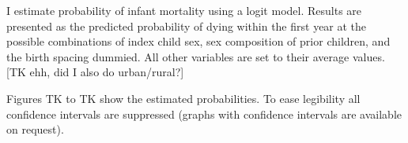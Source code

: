 I estimate probability of infant mortality using a logit model.
Results are presented as the predicted probability of dying within the
first year at the possible combinations of index child sex, sex composition
of prior children, and the birth spacing dummied.
All other variables are set to their average values.
[TK ehh, did I also do urban/rural?]

Figures TK to TK show the estimated probabilities.
To ease legibility all confidence intervals are suppressed
(graphs with confidence intervals are available on request).




